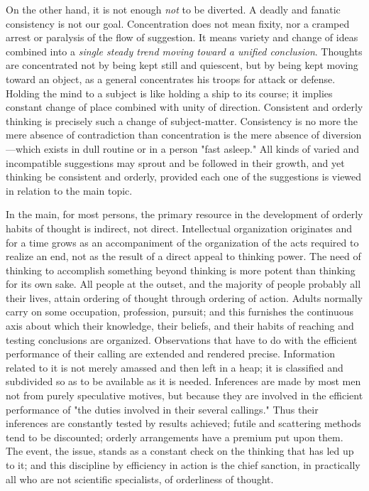 \documentclass[showtrims,ustradepaper]{memoir}
\begin{document}
On the other hand, it is not enough \emph{not} to be diverted. A deadly
and fanatic consistency is not our goal. Concentration does not mean
fixity, nor a cramped arrest or paralysis of the flow of suggestion. It
means variety and change of ideas combined into a \emph{single steady
trend moving toward a unified conclusion}. Thoughts are concentrated not
by being kept still and quiescent, but by being kept moving toward an
object, as a general concentrates his troops for attack or defense.
Holding the mind to a subject is like holding a ship to its course; it
implies constant change of place combined with unity of direction.
Consistent and orderly thinking is precisely such a change of
subject-matter. Consistency is no more the mere absence of contradiction
than concentration is the mere absence of diversion---which exists in
dull routine or in a person "fast asleep." All kinds of varied and
incompatible suggestions may sprout and be followed in their growth, and
yet thinking be consistent and orderly, provided each one of the
suggestions is viewed in relation to the main topic.


In the main, for most persons, the primary
resource
in the development of orderly habits of thought is indirect, not direct.
Intellectual organization originates and for a time grows as an
accompaniment of the organization of the acts required to realize an
end, not as the result of a direct appeal to thinking power. The need of
thinking to accomplish something beyond thinking is more potent than
thinking for its own sake. All people at the outset, and the majority of
people probably all their lives, attain ordering of thought through
ordering of action. Adults normally carry on some occupation,
profession, pursuit; and this furnishes the continuous axis about which
their knowledge, their beliefs, and their habits of reaching and testing
conclusions are organized. Observations that have to do with the
efficient performance of their calling are extended and rendered
precise. Information related to it is not merely amassed and then left
in a heap; it is classified and subdivided so as to be available as it
is needed. Inferences are made by most men not from purely speculative
motives, but because they are involved in the efficient performance of
"the duties involved in their several callings." Thus their inferences
are constantly tested by results achieved; futile and scattering methods
tend to be discounted; orderly arrangements have a premium put upon
them. The event, the issue, stands as a constant check on the thinking
that has led up to it; and this discipline by efficiency in action is
the chief sanction, in practically all who are not scientific
specialists, of orderliness of thought.
\end{document}
